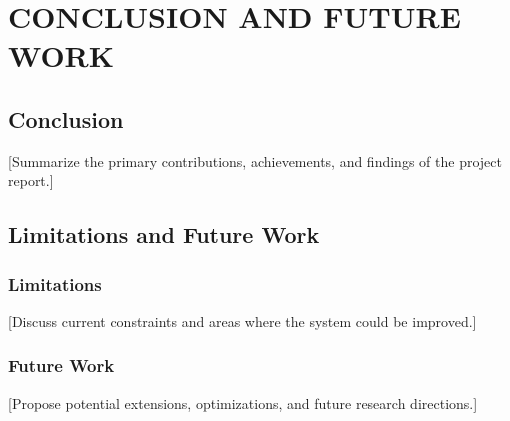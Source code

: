 \chapter{CONCLUSION AND FUTURE WORK}
\label{chap:conclusion}

\section{Conclusion}
\label{sec:conclusion}

[Summarize the primary contributions, achievements, and findings of the project report.]

\section{Limitations and Future Work}
\label{sec:future_work}

\subsection{Limitations}
[Discuss current constraints and areas where the system could be improved.]

\subsection{Future Work}
[Propose potential extensions, optimizations, and future research directions.]
